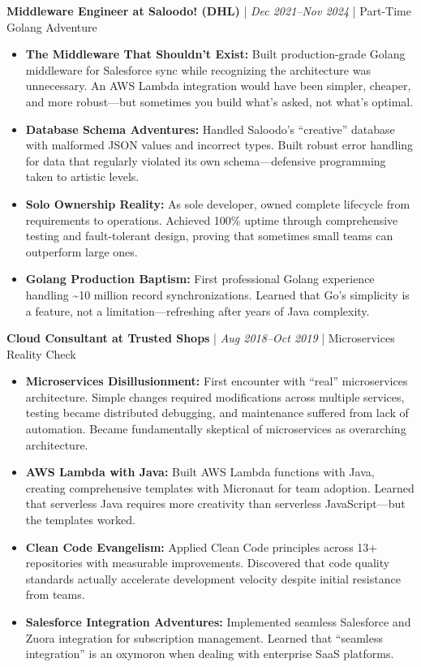 \documentclass[11pt,a4paper]{article}
\newcommand{\jobheader}[3]{
    \vspace{0.2em}
    \textbf{#1} | \textit{#2} | #3
    \vspace{0.1em}
}
\begin{document}
\jobheader{Middleware Engineer at Saloodo! (DHL)}{Dec 2021--Nov 2024}{Part-Time Golang Adventure}

\begin{itemize}[leftmargin=1em,topsep=0pt,itemsep=0.2em]
\item \textbf{The Middleware That Shouldn't Exist:} Built production-grade Golang middleware for Salesforce sync while recognizing the architecture was unnecessary. An AWS Lambda integration would have been simpler, cheaper, and more robust---but sometimes you build what's asked, not what's optimal.
\item \textbf{Database Schema Adventures:} Handled Saloodo's ``creative'' database with malformed JSON values and incorrect types. Built robust error handling for data that regularly violated its own schema---defensive programming taken to artistic levels.
\item \textbf{Solo Ownership Reality:} As sole developer, owned complete lifecycle from requirements to operations. Achieved 100\% uptime through comprehensive testing and fault-tolerant design, proving that sometimes small teams can outperform large ones.
\item \textbf{Golang Production Baptism:} First professional Golang experience handling \textasciitilde 10 million record synchronizations. Learned that Go's simplicity is a feature, not a limitation---refreshing after years of Java complexity.
\end{itemize}

\jobheader{Cloud Consultant at Trusted Shops}{Aug 2018--Oct 2019}{Microservices Reality Check}

\begin{itemize}[leftmargin=1em,topsep=0pt,itemsep=0.2em]
\item \textbf{Microservices Disillusionment:} First encounter with ``real'' microservices architecture. Simple changes required modifications across multiple services, testing became distributed debugging, and maintenance suffered from lack of automation. Became fundamentally skeptical of microservices as overarching architecture.
\item \textbf{AWS Lambda with Java:} Built AWS Lambda functions with Java, creating comprehensive templates with Micronaut for team adoption. Learned that serverless Java requires more creativity than serverless JavaScript---but the templates worked.
\item \textbf{Clean Code Evangelism:} Applied Clean Code principles across 13+ repositories with measurable improvements. Discovered that code quality standards actually accelerate development velocity despite initial resistance from teams.
\item \textbf{Salesforce Integration Adventures:} Implemented seamless Salesforce and Zuora integration for subscription management. Learned that ``seamless integration'' is an oxymoron when dealing with enterprise SaaS platforms.
\end{itemize}
\end{document}
